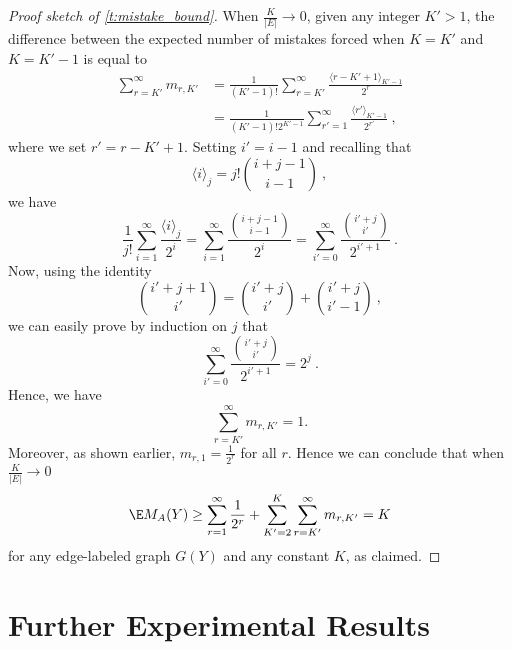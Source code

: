 \begin{proof}[Proof sketch of \autoref{t:mistake_bound}]
When $\frac{K}{|E|} \rightarrow 0$, given any integer $K'>1$, the difference between the expected
number of mistakes forced when $K=K'$ and $K=K'-1$ is equal to
%
\begin{align*}
  \sum_{r=K'}^{\infty} m_{r,K'}
  &=
  \frac{1}{(K'-1)!}\sum_{r=K'}^{\infty} \frac{\langle r-K'+1\rangle_{K'-1}}{2^{r}}\\
  &=
  \frac{1}{(K'-1)!2^{K'-1}}\sum_{r'=1}^{\infty} \frac{\langle r'\rangle_{K'-1}}{2^{r'}}~,
\end{align*}
% 
where we set $r'=r-K'+1$.
Setting $i'=i-1$ and recalling that
\[
\langle i\rangle_j=j!{{i+j-1}\choose{i-1}}~,
\]
we have
\[
\frac{1}{j!}\sum_{i=1}^{\infty}\frac{\langle i\rangle_j}{2^i}=
\sum_{i=1}^{\infty}\frac{{{i+j-1}\choose{i-1}}}{2^i}=
\sum_{i'=0}^{\infty}\frac{{{i'+j}\choose{i'}}}{2^{i'+1}}~.
\]
Now, using the identity
\[
{i'+j+1 \choose i'} = {i'+j \choose i'} + {i'+j \choose i'-1}~,
\]
we can easily prove by induction on $j$ that
\[
\sum_{i'=0}^{\infty}\frac{{{i'+j}\choose{i'}}}{2^{i'+1}}=2^j~.
\]
Hence, we have
\[
\sum_{r=K'}^{\infty} m_{r,K'}=1.
\]
Moreover, as shown earlier, $m_{r,1}=\frac{1}{2^{r}}$ for all $r$. Hence we can conclude that when $\frac{K}{|E|} \rightarrow 0$ 
\[
\E M_A(Y) \ge
\sum_{r=1}^{\infty} \frac{1}{2^{r}} +
\sum_{K'=2}^{K} \sum_{r=K'}^{\infty} m_{r,K'}=K
\]
for any edge-labeled graph $G(Y)$ and any constant $K$, as claimed.
\end{proof}


\iffalse %
In the special case when the bias is
\[
    \Psi(Y) = \min\big\{\Psiin(Y),\Psiout(Y)\big\}
\]
where
\[
    \Psiin(Y) = \sum_{j \in V} \min\big\{\din^-(v),\din^+(v)\big\}
\]
and
\[
    \Psiout(Y) = \sum_{i \in V} \min\big\{\dout^-(u),\dout^+(u)\big\}
\]
then using Randomized Weighted Majority on the two experts
\[
    \Yhat^{(1)}_{u,v} = \sgn\left(\frac{1}{2}-\frac{\hdout^-(u)}{\hdout(u)}\right)
\qquad\text{and}\qquad
    \Yhat^{(2)}_{u,v} = \sgn\left(\frac{1}{2}-\frac{\hdin^-(v)}{\hdin(v)}\right)
\]
we get an expected mistake bound of
\[
    2\Psi(Y) + \sqrt{(4\log 2) \Psi(Y)}~.
\]
\fi %

\section{Further Experimental Results}

